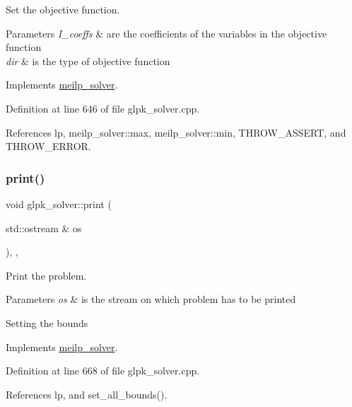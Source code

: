 Set the objective function. 


\begin{DoxyParams}{Parameters}
{\em I\+\_\+coeffs} & are the coefficients of the variables in the objective function \\
\hline
{\em dir} & is the type of objective function \\
\hline
\end{DoxyParams}


Implements \hyperlink{classmeilp__solver_a6478c7167ffb9c270104ba07cc102c58}{meilp\+\_\+solver}.



Definition at line 646 of file glpk\+\_\+solver.\+cpp.



References lp, meilp\+\_\+solver\+::max, meilp\+\_\+solver\+::min, T\+H\+R\+O\+W\+\_\+\+A\+S\+S\+E\+RT, and T\+H\+R\+O\+W\+\_\+\+E\+R\+R\+OR.

\mbox{\label{classglpk__solver_a0a3f1dcdb065e42d04a45a6cd6864b90}} 
\subsubsection{\texorpdfstring{print()}{print()}}
{\footnotesize\ttfamily void glpk\+\_\+solver\+::print (\begin{DoxyParamCaption}\item[{std\+::ostream \&}]{os }\end{DoxyParamCaption})\hspace{0.3cm}{\ttfamily [override]}, {\ttfamily [private]}, {\ttfamily [virtual]}}



Print the problem. 


\begin{DoxyParams}{Parameters}
{\em os} & is the stream on which problem has to be printed \\
\hline
\end{DoxyParams}
Setting the bounds 

Implements \hyperlink{classmeilp__solver_ae7889c65c08ee542bba4913b853e0714}{meilp\+\_\+solver}.



Definition at line 668 of file glpk\+\_\+solver.\+cpp.



References lp, and set\+\_\+all\+\_\+bounds().



